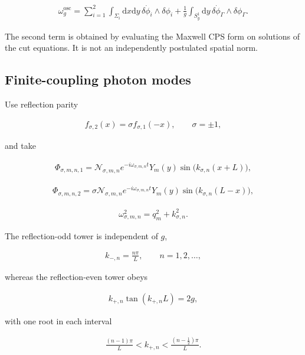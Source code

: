 \begin{align}
\omega_g^{\mathrm{osc}}
=\sum_{i=1}^2\int_{\Sigma_i}\mathrm dx\mathrm dy\,
\delta\dot\phi_i\wedge\delta\phi_i
+\frac1g\int_{S_y^1}\mathrm dy\,
\delta\dot\phi_\Gamma\wedge\delta\phi_\Gamma.
\end{align}

The second term is obtained by evaluating the Maxwell CPS form on solutions of the cut equations. It is not an independently postulated spatial norm.

\subsection{Finite-coupling photon modes}\label{subsec:maxwell-modes}

Use reflection parity

\begin{align}
f_{\sigma,2}(x)=\sigma f_{\sigma,1}(-x),
\qquad
\sigma=\pm1,
\end{align}

and take

\begin{align}
\Phi_{\sigma,m,n,1}
=\mathcal N_{\sigma,m,n}e^{-i\omega_{\sigma,m,n}t}
Y_m(y)\sin\bigl(k_{\sigma,n}(x+L)\bigr),
\end{align}

\begin{align}
\Phi_{\sigma,m,n,2}
=\sigma\mathcal N_{\sigma,m,n}e^{-i\omega_{\sigma,m,n}t}
Y_m(y)\sin\bigl(k_{\sigma,n}(L-x)\bigr),
\end{align}

\begin{align}
\omega_{\sigma,m,n}^2=q_m^2+k_{\sigma,n}^2.
\end{align}

The reflection-odd tower is independent of $g$,

\begin{align}
k_{-,n}=\frac{n\pi}{L},
\qquad
n=1,2,\ldots,
\end{align}

whereas the reflection-even tower obeys

\begin{align}
k_{+,n}\tan(k_{+,n}L)=2g,
\end{align}

with one root in each interval

\begin{align}
\frac{(n-1)\pi}{L}<k_{+,n}<\frac{(n-\frac12)\pi}{L}.
\end{align}

